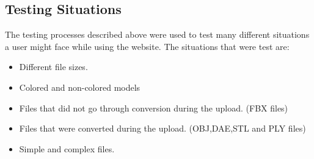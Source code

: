    \subsection{Testing Situations}
    The testing processes described above were used to test many different situations a user might face while using the website. The situations that were test are:

    \begin{itemize}
        \item Different file sizes.
        \item Colored and non-colored models
        \item Files that did not go through conversion during the upload. (FBX files)
        \item Files that were converted during the upload. (OBJ,DAE,STL and PLY files)
        \item Simple and complex files.
    \end{itemize}